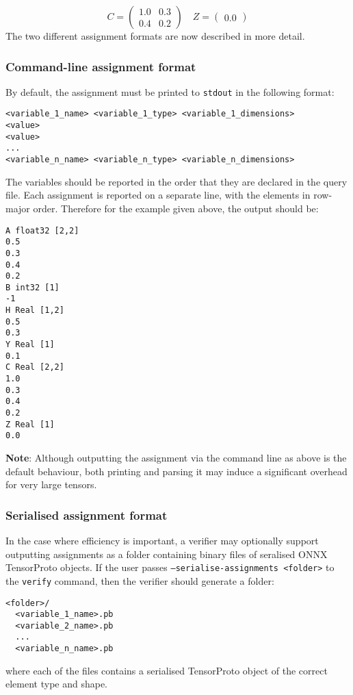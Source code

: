 \begin{equation*}
C = \begin{pmatrix}
1.0 & 0.3 \\
0.4 & 0.2
\end{pmatrix}
\quad
Z = \begin{pmatrix}
0.0
\end{pmatrix}
\end{equation*}
The two different assignment formats are now described in more detail.

\subsubsection{Command-line assignment format}

By default, the assignment must be printed to \texttt{stdout} in the following format:
\begin{lstlisting}[style=bash]
<variable_1_name> <variable_1_type> <variable_1_dimensions>
<value>
<value>
...
<variable_n_name> <variable_n_type> <variable_n_dimensions>
\end{lstlisting}
The variables should be reported in the order that they are declared in the query file. Each assignment is reported on a separate line, with the elements in row-major order. 
Therefore for the example given above, the output should be:
\begin{lstlisting}[style=bash]
A float32 [2,2]
0.5
0.3
0.4
0.2
B int32 [1]
-1
H Real [1,2]
0.5
0.3
Y Real [1]
0.1
C Real [2,2]
1.0
0.3
0.4
0.2
Z Real [1]
0.0
\end{lstlisting}

\textbf{Note}: Although outputting the assignment via the command line as above is the default behaviour, both printing and parsing it may induce a significant overhead for very large tensors. 

\subsubsection{Serialised assignment format}
\label{sec:seralised-assignment-format}

In the case where efficiency is important, a verifier may optionally support outputting assignments as a folder containing binary files of seralised ONNX TensorProto objects. If the user passes \texttt{--serialise-assignments <folder>} to the \texttt{verify} command, then the verifier should generate a folder:
\begin{lstlisting}[style=bash]
<folder>/
  <variable_1_name>.pb
  <variable_2_name>.pb
  ...
  <variable_n_name>.pb
\end{lstlisting}
where each of the files contains a serialised TensorProto object of the correct element type and shape.

